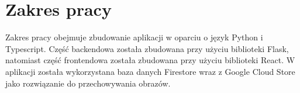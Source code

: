 \section{Zakres pracy}
Zakres pracy obejmuje zbudowanie aplikacji w oparciu o język Python i Typescript. Część backendowa została zbudowana przy użyciu biblioteki Flask, natomiast część frontendowa została zbudowana przy użyciu biblioteki React. W aplikacji została wykorzystana baza danych Firestore wraz z Google Cloud Store jako rozwiązanie do przechowywania obrazów. 
